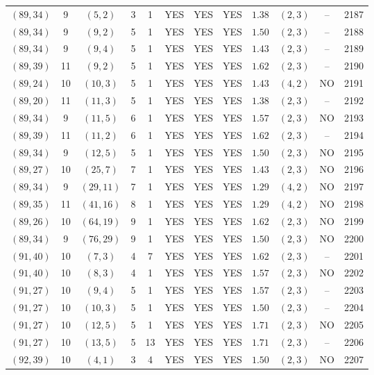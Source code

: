 \begin{longtable}{|c|c|c|c|c|c|c|c|c|c|c|c|}
$(89,34)$ & 9 & $(5,2)$ & 3 & 1 & YES & YES & YES & $1.38$ & $(2,3)$ & -- & 2187\\
$(89,34)$ & 9 & $(9,2)$ & 5 & 1 & YES & YES & YES & $1.50$ & $(2,3)$ & -- & 2188\\
$(89,34)$ & 9 & $(9,4)$ & 5 & 1 & YES & YES & YES & $1.43$ & $(2,3)$ & -- & 2189\\
$(89,39)$ & 11 & $(9,2)$ & 5 & 1 & YES & YES & YES & $1.62$ & $(2,3)$ & -- & 2190\\
$(89,24)$ & 10 & $(10,3)$ & 5 & 1 & YES & YES & YES & $1.43$ & $(4,2)$ & NO & 2191\\
$(89,20)$ & 11 & $(11,3)$ & 5 & 1 & YES & YES & YES & $1.38$ & $(2,3)$ & -- & 2192\\
$(89,34)$ & 9 & $(11,5)$ & 6 & 1 & YES & YES & YES & $1.57$ & $(2,3)$ & NO & 2193\\
$(89,39)$ & 11 & $(11,2)$ & 6 & 1 & YES & YES & YES & $1.62$ & $(2,3)$ & -- & 2194\\
$(89,34)$ & 9 & $(12,5)$ & 5 & 1 & YES & YES & YES & $1.50$ & $(2,3)$ & NO & 2195\\
$(89,27)$ & 10 & $(25,7)$ & 7 & 1 & YES & YES & YES & $1.43$ & $(2,3)$ & NO & 2196\\
$(89,34)$ & 9 & $(29,11)$ & 7 & 1 & YES & YES & YES & $1.29$ & $(4,2)$ & NO & 2197\\
$(89,35)$ & 11 & $(41,16)$ & 8 & 1 & YES & YES & YES & $1.29$ & $(4,2)$ & NO & 2198\\
$(89,26)$ & 10 & $(64,19)$ & 9 & 1 & YES & YES & YES & $1.62$ & $(2,3)$ & NO & 2199\\
$(89,34)$ & 9 & $(76,29)$ & 9 & 1 & YES & YES & YES & $1.50$ & $(2,3)$ & NO & 2200\\
$(91,40)$ & 10 & $(7,3)$ & 4 & 7 & YES & YES & YES & $1.62$ & $(2,3)$ & -- & 2201\\
$(91,40)$ & 10 & $(8,3)$ & 4 & 1 & YES & YES & YES & $1.57$ & $(2,3)$ & NO & 2202\\
$(91,27)$ & 10 & $(9,4)$ & 5 & 1 & YES & YES & YES & $1.57$ & $(2,3)$ & -- & 2203\\
$(91,27)$ & 10 & $(10,3)$ & 5 & 1 & YES & YES & YES & $1.50$ & $(2,3)$ & -- & 2204\\
$(91,27)$ & 10 & $(12,5)$ & 5 & 1 & YES & YES & YES & $1.71$ & $(2,3)$ & NO & 2205\\
$(91,27)$ & 10 & $(13,5)$ & 5 & 13 & YES & YES & YES & $1.71$ & $(2,3)$ & -- & 2206\\
$(92,39)$ & 10 & $(4,1)$ & 3 & 4 & YES & YES & YES & $1.50$ & $(2,3)$ & NO & 2207\\

\end{longtable}
